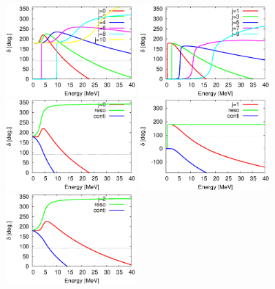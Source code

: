\documentclass[english,12pt]{jsarticle}
\begin{document}
\begin{figure}
 \begin{minipage}{0.6\textwidth}
  \includegraphics[width=5cm]{phs_posi.eps}
 \end{minipage}
 \begin{minipage}{0.6\textwidth}
  \includegraphics[width=5cm]{phs_nega.eps}
 \end{minipage}
 \begin{minipage}{0.6\textwidth}
  \includegraphics[width=5cm]{allphs_0.eps}
 \end{minipage}
 \begin{minipage}{0.6\textwidth}
  \includegraphics[width=5cm]{allphs_1.eps}
 \end{minipage}
 \begin{minipage}{0.6\textwidth}
  \includegraphics[width=5cm]{allphs_2.eps}

\end{minipage}
\end{figure}
\end{document}
